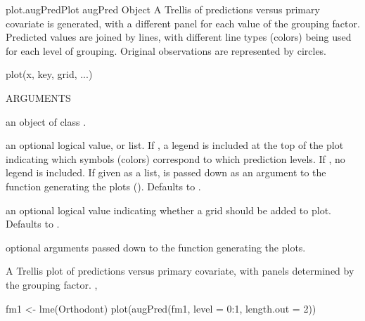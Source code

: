 \documentclass[pdftex]{article} \usepackage{url,graphicx}
\begin{document}
\begin{Helpfile}{plot.augPred}{Plot augPred Object}
A Trellis  of predictions versus primary  covariate is
generated, with a different panel for each value of the grouping
factor. Predicted values are joined by lines, with  
different line types (colors) being used for each level of
grouping. Original observations are represented by circles.
\begin{Example}
plot(x, key, grid, ...)
\end{Example}
\begin{Argument}{ARGUMENTS}
\item[\Co{x:}]
an object of class .
\item[\Co{key:}]
an optional logical value, or list. If , a legend
is included at the top of the plot indicating which symbols (colors)
correspond to which prediction levels. If , no legend
is included. If given as a list,  is passed down as an
argument to the  function generating the plots
(). Defaults to .
\item[\Co{grid:}]
an optional logical value indicating whether a grid should
be added to plot. Defaults to .
\item[\Co{...:}]
optional arguments passed down to the 
function generating the plots.
\end{Argument}
A Trellis plot of predictions versus primary covariate, with panels
determined by the grouping factor.
, 
\need 15pt
\vspace{-16pt} 
\begin{Example}
fm1 <- lme(Orthodont)
plot(augPred(fm1, level = 0:1, length.out = 2))
\end{Example}
\end{Helpfile}
\end{document}
